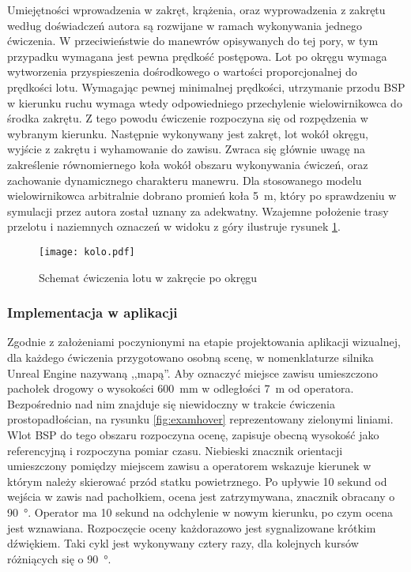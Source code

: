 Umiejętności wprowadzenia w zakręt, krążenia, oraz wyprowadzenia z zakrętu według doświadczeń autora są rozwijane w ramach wykonywania jednego ćwiczenia. W przeciwieństwie do manewrów opisywanych do tej pory, w tym przypadku wymagana jest pewna prędkość postępowa. Lot po okręgu wymaga wytworzenia przyspieszenia dośrodkowego o wartości proporcjonalnej do prędkości lotu. Wymagając pewnej minimalnej prędkości, utrzymanie przodu BSP w kierunku ruchu wymaga wtedy odpowiedniego przechylenie wielowirnikowca do środka zakrętu. Z tego powodu ćwiczenie rozpoczyna się od rozpędzenia w wybranym kierunku. Następnie wykonywany jest zakręt, lot wokół okręgu, wyjście z zakrętu i wyhamowanie do zawisu. Zwraca się głównie uwagę na zakreślenie równomiernego koła wokół obszaru wykonywania ćwiczeń, oraz zachowanie dynamicznego charakteru manewru. Dla stosowanego modelu wielowirnikowca arbitralnie dobrano promień koła 5~m, który po sprawdzeniu w symulacji przez autora został uznany za adekwatny. Wzajemne położenie trasy przelotu i naziemnych oznaczeń w widoku z góry ilustruje rysunek \ref{fig:kolo}.

\begin{figure}[!h]
    \centering \texttt{[image: kolo.pdf]}
    \caption{Schemat ćwiczenia lotu w zakręcie po okręgu}
    \label{fig:kolo}
\end{figure}

\subsubsection{Implementacja w aplikacji}
Zgodnie z założeniami poczynionymi na etapie projektowania aplikacji wizualnej, dla każdego ćwiczenia przygotowano osobną scenę, w nomenklaturze silnika Unreal Engine nazywaną ,,mapą''. Aby oznaczyć miejsce zawisu umieszczono pachołek drogowy o wysokości 600~mm w odległości 7~m od operatora. Bezpośrednio nad nim znajduje się niewidoczny w trakcie ćwiczenia prostopadłościan, na rysunku \ref{fig:examhover} reprezentowany zielonymi liniami. Wlot BSP do tego obszaru rozpoczyna ocenę, zapisuje obecną wysokość jako referencyjną i rozpoczyna pomiar czasu. Niebieski znacznik orientacji umieszczony pomiędzy miejscem zawisu a operatorem wskazuje kierunek w którym należy skierować przód statku powietrznego. Po upływie 10 sekund od wejścia w zawis nad pachołkiem, ocena jest zatrzymywana, znacznik obracany o 90~°. Operator ma 10 sekund na odchylenie w nowym kierunku, po czym ocena jest wznawiana. Rozpoczęcie oceny każdorazowo jest sygnalizowane krótkim dźwiękiem. Taki cykl jest wykonywany cztery razy, dla kolejnych kursów różniących się o 90~°.


